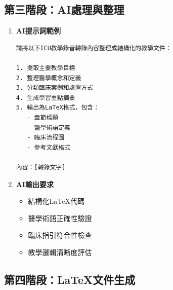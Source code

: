 \documentclass[12pt,a4paper]{article}
\begin{document}
\subsection{第三階段：AI處理與整理}
\begin{enumerate}[itemsep=0.5em]
    \item \textbf{AI提示詞範例}
    \begin{lstlisting}[language=bash, caption=AI處理指令]
請將以下ICU教學錄音轉錄內容整理成結構化的教學文件：

1. 提取主要教學目標
2. 整理醫學概念和定義
3. 分類臨床案例和處置方式
4. 生成學習重點摘要
5. 輸出為LaTeX格式，包含：
   - 章節標題
   - 醫學術語定義
   - 臨床流程圖
   - 參考文獻格式

內容：[轉錄文字]
    \end{lstlisting}
    
    \item \textbf{AI輸出要求}
    \begin{itemize}
        \item 結構化LaTeX代碼
        \item 醫學術語正確性驗證
        \item 臨床指引符合性檢查
        \item 教學邏輯清晰度評估
    \end{itemize}
\end{enumerate}

\subsection{第四階段：LaTeX文件生成}
\end{document}
